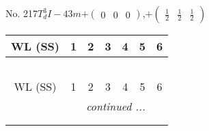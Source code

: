 \documentclass[fleqn,9pt,landscape]{jsarticle}
\begin{document}
\begin{center}
\begin{longtable}{ccccccc}
\end{longtable}
\end{center}
\newpage
No. 217\quad$T_{d}^{3}$\quad$I-43m$\quad[ cubic ]\quad$+\begin{pmatrix} 0 & 0 & 0 \end{pmatrix}$,\quad $+\begin{pmatrix} \frac{1}{2} & \frac{1}{2} & \frac{1}{2} \end{pmatrix}$
\begin{center}
\renewcommand{\arraystretch}{1.2}
\begin{longtable}{ccccccc}
 \hline \hline
WL (SS) & 1 & 2 & 3 & 4 & 5 & 6 \\ \hline \endfirsthead

\multicolumn{6}{l}{\tablename\ \thetable{}} \\
 \hline \hline
WL (SS) & 1 & 2 & 3 & 4 & 5 & 6 \\ \hline \endhead

 \hline \hline
\multicolumn{6}{r}{\footnotesize\it continued ...} \\ \endfoot

 \hline \hline
\multicolumn{6}{r}{} \\ \endlastfoot


\end{longtable}
\end{center}
\end{document}
